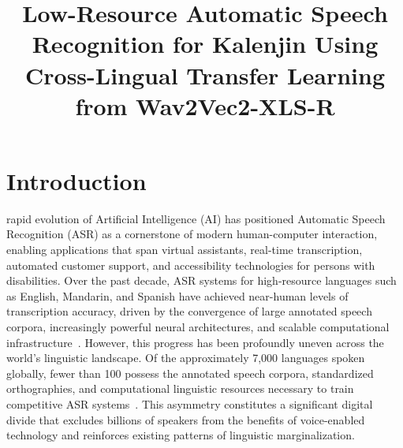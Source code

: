 \documentclass[journal]{IEEEtran}
\begin{document}
\title{Low-Resource Automatic Speech Recognition for Kalenjin Using Cross-Lingual Transfer Learning from Wav2Vec2-XLS-R}

\author{
}

\maketitle

\section{Introduction}

 rapid evolution of Artificial Intelligence (AI) has positioned Automatic Speech Recognition (ASR) as a cornerstone of modern human-computer interaction, enabling applications that span virtual assistants, real-time transcription, automated customer support, and accessibility technologies for persons with disabilities. Over the past decade, ASR systems for high-resource languages such as English, Mandarin, and Spanish have achieved near-human levels of transcription accuracy, driven by the convergence of large annotated speech corpora, increasingly powerful neural architectures, and scalable computational infrastructure~\cite{baevski2020wav2vec, radford2023robust}. However, this progress has been profoundly uneven across the world's linguistic landscape. Of the approximately 7,000 languages spoken globally, fewer than 100 possess the annotated speech corpora, standardized orthographies, and computational linguistic resources necessary to train competitive ASR systems~\cite{joshi2020state}. This asymmetry constitutes a significant digital divide that excludes billions of speakers from the benefits of voice-enabled technology and reinforces existing patterns of linguistic marginalization.
\end{document}
